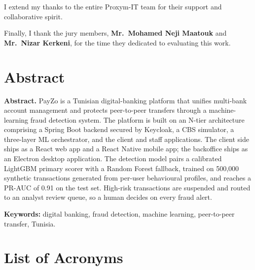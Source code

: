 \documentclass[12pt,a4paper]{report}
\begin{document}
I extend my thanks to the entire Proxym-IT team for their support and collaborative spirit.

Finally, I thank the jury members, \textbf{Mr.\ Mohamed Neji Maatouk} and \textbf{Mr.\ Nizar Kerkeni}, for the
time they dedicated to evaluating this work.

\chapter*{Abstract}
\thispagestyle{plain}

\noindent\textbf{Abstract.}\quad
PayZo is a Tunisian digital-banking platform that unifies multi-bank account management and
protects peer-to-peer transfers through a machine-learning fraud detection system. The platform
is built on an N-tier architecture comprising a Spring Boot backend secured by Keycloak, a CBS
simulator, a three-layer ML orchestrator, and the client and staff applications. The client
side ships as a React web app and a React Native mobile app; the backoffice ships as an Electron
desktop application. The detection model pairs a calibrated LightGBM primary scorer with a
Random Forest fallback, trained on 500,000 synthetic transactions generated from per-user
behavioural profiles, and reaches a PR-AUC of 0.91 on the test set. High-risk transactions are
suspended and routed to an analyst review queue, so a human decides on every fraud alert.

\vspace{6pt}
\noindent\textbf{Keywords:} digital banking, fraud detection, machine learning, peer-to-peer
transfer, Tunisia.

\tableofcontents

\clearpage
{}
\listoffigures

\clearpage
{}
\listoftables

\chapter*{List of Acronyms}
\thispagestyle{plain}
\end{document}
